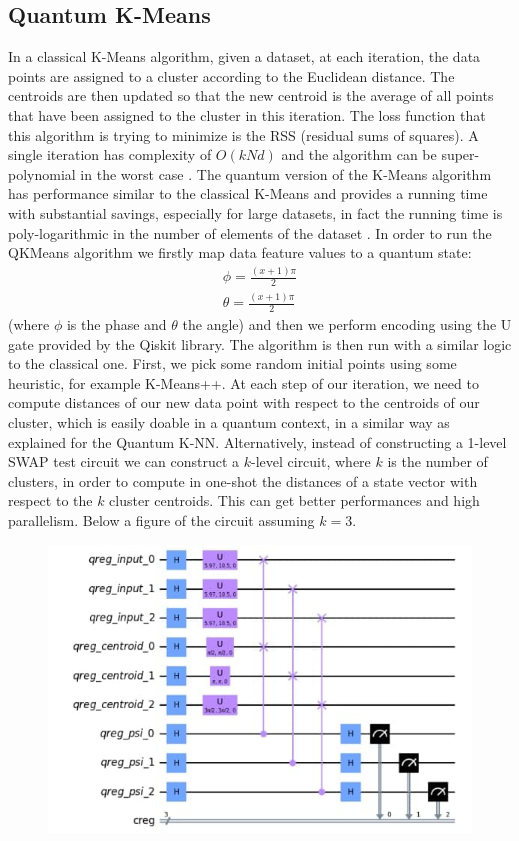 \documentclass{article}
\begin{document}
\begin{multicols}{2}
\subsection{Quantum K-Means}
In a classical K-Means algorithm, given a dataset, at each iteration, the data points are assigned to a cluster according to the Euclidean distance. The centroids are then updated so that the new centroid is the average of all points that have been assigned to the cluster in this iteration. The loss function that this algorithm is trying to minimize is the RSS (residual sums of squares). A single iteration has complexity of $O(kNd)$ and the algorithm can be super-polynomial in the worst case \cite{10.1145/1137856.1137880}.
The quantum version of the K-Means algorithm has performance similar to the classical K-Means and provides a running time with substantial savings, especially for large datasets, in fact the running time is poly-logarithmic in the number of elements of the dataset \cite{Kerenidis2018-gl}.
In order to run the QKMeans algorithm we firstly map data feature values to a quantum state:
\begin{align*}
\phi = \frac{(x+1)\pi}{2}\\
\theta = \frac{(x+1)\pi}{2}
\end{align*}
(where \(\phi\) is the phase and \(\theta\) the angle) and then we perform encoding using the U gate provided by the Qiskit library.
The algorithm is then run with a similar logic to the classical one. First, we pick some random initial points using some heuristic, for example K-Means++\cite{10.5555/1283383.1283494}. At each step of our iteration, we need to compute distances of our new data point with respect to the centroids of our cluster, which is easily doable in a quantum context, in a similar way as explained for the Quantum K-NN. Alternatively, instead of constructing a 1-level SWAP test circuit we can construct a $k$-level circuit, where $k$ is the number of clusters, in order to compute in one-shot the distances of a state vector with respect to the $k$ cluster centroids. This can get better performances and high parallelism. Below a figure of the circuit assuming $k=3$.
\begin{figure}[H]
  \centering
    \includegraphics[width=\linewidth]{assets/qkmeans_circuit.jpg}
\end{figure}


\end{multicols}
\end{document}
